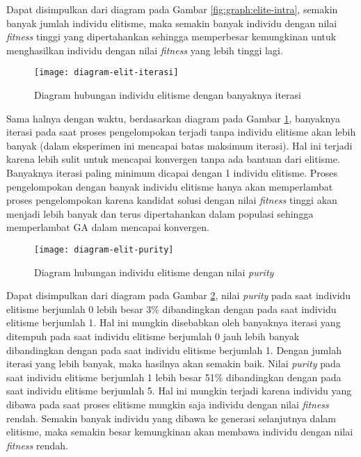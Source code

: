 \begin{enumerate}
		Dapat disimpulkan dari diagram pada Gambar \ref{fig:graph:elite-intra}, semakin banyak jumlah individu elitisme, maka semakin banyak individu dengan nilai \textit{fitness} tinggi yang dipertahankan sehingga memperbesar kemungkinan untuk menghasilkan individu dengan nilai \textit{fitness} yang lebih tinggi lagi.
		
		\begin{figure}[H]
			\centering
			\texttt{[image: diagram-elit-iterasi]}
			\caption{Diagram hubungan individu elitisme dengan banyaknya iterasi}
			\label{fig:graph:elite-iteration}
		\end{figure}
		
		Sama halnya dengan waktu, berdasarkan diagram pada Gambar \ref{fig:graph:elite-iteration}, banyaknya iterasi pada saat proses pengelompokan terjadi tanpa individu elitisme akan lebih banyak (dalam eksperimen ini mencapai batas maksimum iterasi). Hal ini terjadi karena lebih sulit untuk mencapai konvergen tanpa ada bantuan dari elitisme. Banyaknya iterasi paling minimum dicapai dengan 1 individu elitisme. Proses pengelompokan dengan banyak individu elitisme hanya akan memperlambat proses pengelompokan karena kandidat solusi dengan nilai \textit{fitness} tinggi akan menjadi lebih banyak dan terus dipertahankan dalam populasi sehingga memperlambat GA dalam mencapai konvergen.
		
		\begin{figure}[H]
			\centering
			\texttt{[image: diagram-elit-purity]}
			\caption{Diagram hubungan individu elitisme dengan nilai \textit{purity}}
			\label{fig:graph:elite-purity}
		\end{figure}
		
		Dapat disimpulkan dari diagram pada Gambar \ref{fig:graph:elite-purity}, nilai \textit{purity} pada saat individu elitisme berjumlah 0 lebih besar 3\% dibandingkan dengan pada saat individu elitisme berjumlah 1. Hal ini mungkin disebabkan oleh banyaknya iterasi yang ditempuh pada saat individu elitisme berjumlah 0 jauh lebih banyak dibandingkan dengan pada saat individu elitisme berjumlah 1. Dengan jumlah iterasi yang lebih banyak, maka hasilnya akan semakin baik. Nilai \textit{purity} pada saat individu elitisme berjumlah 1 lebih besar 51\% dibandingkan dengan pada saat individu elitisme berjumlah 5. Hal ini mungkin terjadi karena individu yang dibawa pada saat proses elitisme mungkin saja individu dengan nilai \textit{fitness} rendah. Semakin banyak individu yang dibawa ke generasi selanjutnya dalam elitisme, maka semakin besar kemungkinan akan membawa individu dengan nilai \textit{fitness} rendah.
\end{enumerate}

